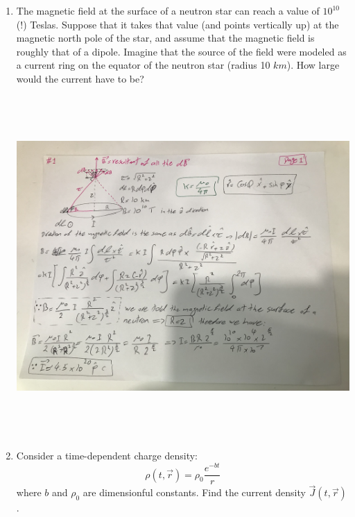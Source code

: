 \documentclass[fleqn]{article}
\begin{document}
  \begin{enumerate}
    \item The magnetic field at the surface of a neutron star can reach a value of $10^{10}$ (!) Teslas. Suppose that it takes that value 
    (and points vertically up) at the magnetic north pole of the star, and assume that the magnetic field is roughly that of a dipole. 
    Imagine that the source of the field were modeled as a current ring on the equator of the neutron star (radius 10 $km$). How large 
    would the current have to be?

    \includegraphics[height=13cm, width=15cm]{1.jpg}

    \pagebreak

    \item Consider a time-dependent charge density:
    $$
      \rho(t, \overrightarrow{r})=\rho_0 \dfrac{e^{-bt}}{r}
    $$
    where $b$ and $\rho_0$ are dimensionful constants. Find the current density $\overrightarrow{J}(t, \overrightarrow{r})$.


\end{enumerate}
\end{document}
